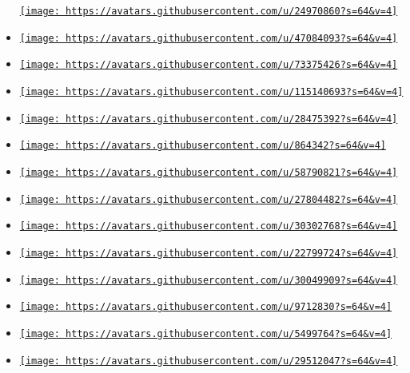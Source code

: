 \begin{itemize}
  \href{https://github.com/Jollywatt}{\texttt{[image: https://avatars.githubusercontent.com/u/24970860?s=64\&v=4]}}
\item
  \href{https://github.com/LaurenzV}{\texttt{[image: https://avatars.githubusercontent.com/u/47084093?s=64\&v=4]}}
\item
  \href{https://github.com/YDX-2147483647}{\texttt{[image: https://avatars.githubusercontent.com/u/73375426?s=64\&v=4]}}
\item
  \href{https://github.com/k-84mo10}{\texttt{[image: https://avatars.githubusercontent.com/u/115140693?s=64\&v=4]}}
\item
  \href{https://github.com/s-cerevisiae}{\texttt{[image: https://avatars.githubusercontent.com/u/28475392?s=64\&v=4]}}
\item
  \href{https://github.com/01mf02}{\texttt{[image: https://avatars.githubusercontent.com/u/864342?s=64\&v=4]}}
\item
  \href{https://github.com/A-Walrus}{\texttt{[image: https://avatars.githubusercontent.com/u/58790821?s=64\&v=4]}}
\item
  \href{https://github.com/C0ffeeCode}{\texttt{[image: https://avatars.githubusercontent.com/u/27804482?s=64\&v=4]}}
\item
  \href{https://github.com/CosmicHorrorDev}{\texttt{[image: https://avatars.githubusercontent.com/u/30302768?s=64\&v=4]}}
\item
  \href{https://github.com/DavidMazarro}{\texttt{[image: https://avatars.githubusercontent.com/u/22799724?s=64\&v=4]}}
\item
  \href{https://github.com/Hofer-Julian}{\texttt{[image: https://avatars.githubusercontent.com/u/30049909?s=64\&v=4]}}
\item
  \href{https://github.com/Jocs}{\texttt{[image: https://avatars.githubusercontent.com/u/9712830?s=64\&v=4]}}
\item
  \href{https://github.com/Midbin}{\texttt{[image: https://avatars.githubusercontent.com/u/5499764?s=64\&v=4]}}
\item
  \href{https://github.com/Quaqqer}{\texttt{[image: https://avatars.githubusercontent.com/u/29512047?s=64\&v=4]}}

\end{itemize}
